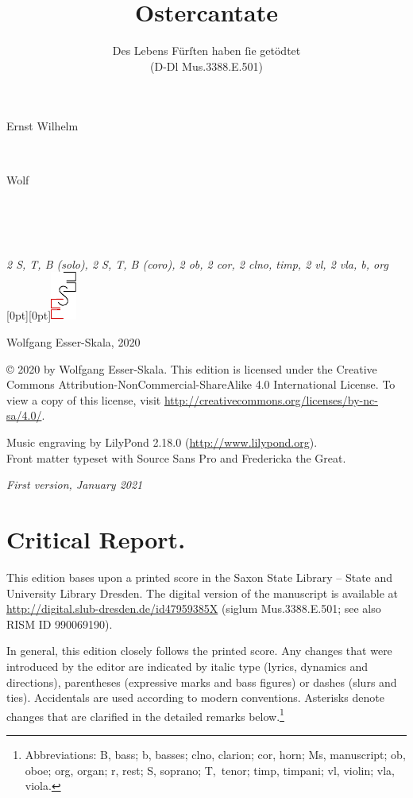 \documentclass[parskip=full]{scrreprt}
\makeatletter
\DeclareRobustCommand{\sbseries}{\fontseries{sb}\selectfont}
\newcommand\fancytitlehead{
	\headingfont%
	\fontsize{80}{80}\selectfont\textcolor{black!80}{\@ifundefined{@shortname}{\@lastname}{\@shortname}.}\\[15pt]%
	\fontsize{60}{60}\selectfont\@ifundefined{@shorttitle}{\@title}{\@shorttitle}.%
}
\def\firstname#1{\def\@firstname{#1}}
\def\lastname#1{\def\@lastname{#1}}
\def\instrumentation#1{\def\@instrumentation{#1}}
\def\maketitle{%
\begin{titlepage}%
	\Large%
	{\@titlehead}%
	\vfill%
	{\strut\@firstname}\\%
	{\sbseries\color{oldred}\strut\@lastname}\\%
	{\strut\@namesuffix}%
	\vfill%
	{\sbseries\@title}\\%
	{\@subtitle}\\[\baselineskip]%
	{\itshape\@instrumentation}%
	\vfill%
	{\itshape\@parts}\hspace*{\fill}\raisebox{0pt}[0pt][0pt]{\includegraphics{ees_logo}}%
\end{titlepage}%
}
\newif\ifprintreport\printreportfalse
\makeatother
\begin{document}
\frenchspacing

\titlehead{\fancytitlehead}
\firstname{Ernst Wilhelm}
\lastname{Wolf}
\title{Ostercantate}
\subtitle{Des Lebens Fürſten haben ſie getödtet\\(D-Dl Mus.3388.E.501)}
\instrumentation{2 S, T, B (solo), 2 S, T, B (coro), 2 ob, 2 cor, 2 clno, timp, 2 vl, 2 vla, b, org}
\maketitle


\thispagestyle{empty}

\vspace*{\fill}

\hspace*{1em}Wolfgang Esser-Skala, 2020

© 2020 by Wolfgang Esser-Skala. This edition is licensed under the Creative Commons Attribution-NonCommercial-ShareAlike 4.0 International License. To view a copy of this license, visit \url{http://creativecommons.org/licenses/by-nc-sa/4.0/}. 

Music engraving by LilyPond 2.18.0 (\url{http://www.lilypond.org}).\\
Front matter typeset with Source Sans Pro and Fredericka the Great.

\textit{First version, January 2021}

\vspace*{2cm}

\ifprintreport
\chapter*{Critical Report.}

This edition bases upon a printed score in the Saxon State Library – State and University Library Dresden. The digital version of the manuscript is available at \url{http://digital.slub-dresden.de/id47959385X} (siglum Mus.3388.E.501; see also RISM ID 990069190).

In general, this edition closely follows the printed score. Any changes that were introduced by the editor are indicated by italic type (lyrics, dynamics and directions), parentheses (expressive marks and bass figures) or dashes (slurs and ties). Accidentals are used according to modern conventions. Asterisks denote changes that are clarified in the detailed remarks below.\footnote{Abbreviations: B, bass; b, basses; clno, clarion; cor, horn; Ms, manuscript; ob, oboe; org, organ; r, rest; S, soprano; T,~tenor; timp, timpani; vl, violin; vla, viola.}
\end{document}
